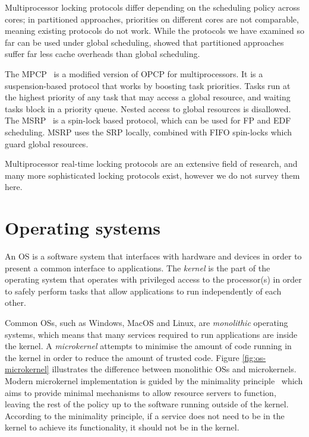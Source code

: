 Multiprocessor locking protocols differ depending on the scheduling policy across cores; in
partitioned approaches, priorities on different cores are not comparable, meaning existing protocols
do not work. While the protocols we have examined so far can be used under global scheduling,
\citet{Brandenburg:phd} showed that partitioned approaches suffer far less cache overheads than
global scheduling. 

The \gls{MPCP}~\citep{Rajkumar_90} is a modified version of \gls{OPCP} for multiprocessors. It is a
suspension-based protocol that works by boosting task priorities. Tasks run at the highest priority
of any task that may access a global resource, and waiting tasks block in a priority queue. Nested
access to global resources is disallowed. The \gls{MSRP}~\citep{Gai_DL_03} is a spin-lock based
protocol, which can be used for \gls{FP} and \gls{EDF} scheduling. \gls{MSRP} uses the \gls{SRP} locally,
combined with \gls{FIFO} spin-locks which guard global resources. 

Multiprocessor real-time locking protocols are an extensive field of research, and 
many more sophisticated locking protocols exist, however we do not survey them here.

\section{Operating systems}
\label{sec:background-operating-systems}

An \gls{OS} is a software system that interfaces with hardware and devices in order to present a
common interface to applications.  The \emph{kernel} is the part of the operating system that
operates with privileged access to the processor(s) in order to safely perform tasks that allow
applications to run independently of each other.

Common \glspl{OS}, such as Windows, MacOS and Linux, are \emph{monolithic} operating systems,
which means that many services required to run applications are inside the kernel.  A \emph{microkernel}
attempts to minimise the amount of code running in the kernel in order to reduce the amount of
trusted code.  Figure \ref{fig:os-microkernel} illustrates the difference between monolithic
\glspl{OS} and microkernels.  Modern microkernel implementation is guided by the minimality
principle~\citep{Liedtke_95} which aims to provide minimal mechanisms to allow resource servers to
function, leaving the rest of the policy up to the software running outside of the kernel. According
to the minimality principle, if a service does not need to be in the kernel to achieve its
functionality, it should not be in the kernel.

